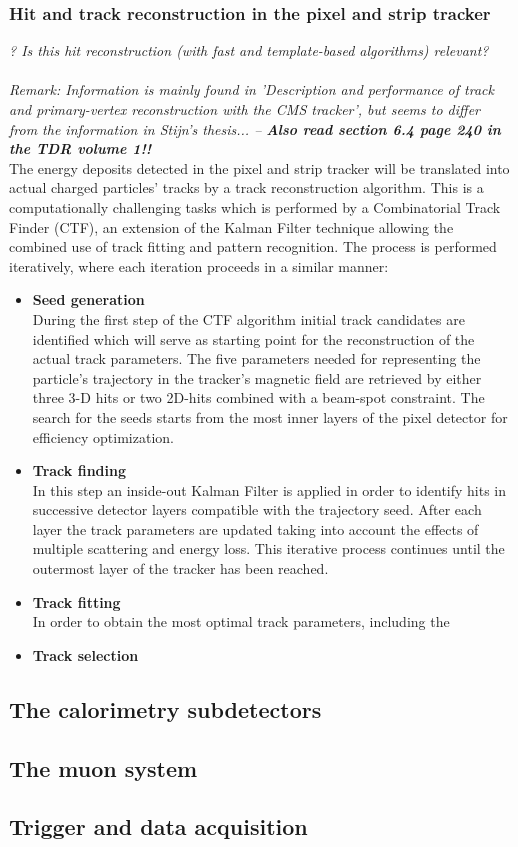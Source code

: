 \subsubsection*{Hit and track reconstruction in the pixel and strip tracker}
\textit{? Is this hit reconstruction (with fast and template-based algorithms) relevant?}\\
\\

\textit{Remark: Information is mainly found in 'Description and performance of track and primary-vertex reconstruction with the CMS tracker', but seems to differ from the information in Stijn's thesis... --  \textbf{Also read section 6.4 page 240 in the TDR volume 1!!}}\\

The energy deposits detected in the pixel and strip tracker will be translated into actual charged particles' tracks by a track reconstruction algorithm. This is a computationally challenging tasks which is performed by a Combinatorial Track Finder (CTF), an extension of the Kalman Filter technique allowing the combined use of track fitting and pattern recognition. The process is performed iteratively, where each iteration proceeds in a similar manner:
\begin{itemize}
 \item \textbf{Seed generation} \\
 During the first step of the CTF algorithm initial track candidates are identified which will serve as starting point for the reconstruction of the actual track parameters. The five parameters needed for representing the particle's trajectory in the tracker's magnetic field are retrieved by either three 3-D hits or two 2D-hits combined with a beam-spot constraint. The search for the seeds starts from the most inner layers of the pixel detector for efficiency optimization.
 \item \textbf{Track finding} \\
 In this step an inside-out Kalman Filter is applied in order to identify hits in successive detector layers compatible with the trajectory seed. After each layer the track parameters are updated taking into account the effects of multiple scattering and energy loss. This iterative process continues until the outermost layer of the tracker has been reached.
 \item \textbf{Track fitting} \\
 In order to obtain the most optimal track parameters, including the 
 \item \textbf{Track selection} \\
\end{itemize}

\subsection{The calorimetry subdetectors}

\subsection{The muon system}

\subsection{Trigger and data acquisition}
